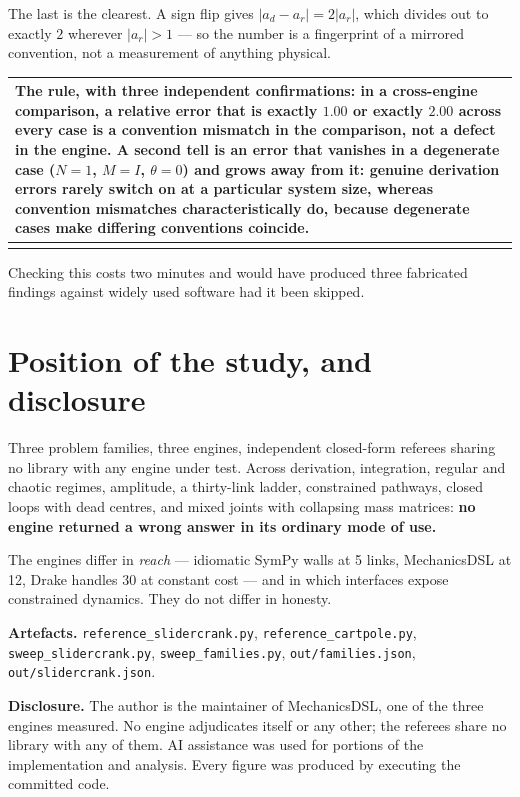 \documentclass[11pt,a4paper]{article}
\makeatletter
\newenvironment{callout}
  {\par\medskip\noindent\begin{tabular}{@{}p{0.94\textwidth}@{}}
   \arrayrulecolor{warnrule}\hline\rule{0pt}{2.6ex}}
  {\\[0.8ex]\hline\arrayrulecolor{black}\end{tabular}\par\medskip}
\makeatother
\begin{document}
\noindent The last is the clearest. A sign flip gives
$|a_d - a_r| = 2|a_r|$, which divides out to exactly $2$ wherever
$|a_r| > 1$ --- so the number is a fingerprint of a mirrored convention, not a
measurement of anything physical.

\begin{callout}
\textbf{The rule, with three independent confirmations:} in a cross-engine
comparison, a relative error that is exactly $1.00$ or exactly $2.00$ across
every case is a convention mismatch in the comparison, not a defect in the
engine. A second tell is an error that vanishes in a degenerate case
($N=1$, $M=I$, $\theta=0$) and grows away from it: genuine derivation errors
rarely switch on at a particular system size, whereas convention mismatches
characteristically do, because degenerate cases make differing conventions
coincide.
\end{callout}

\noindent Checking this costs two minutes and would have produced three
fabricated findings against widely used software had it been skipped.

\section{Position of the study, and disclosure}

Three problem families, three engines, independent closed-form referees sharing
no library with any engine under test. Across derivation, integration, regular
and chaotic regimes, amplitude, a thirty-link ladder, constrained pathways,
closed loops with dead centres, and mixed joints with collapsing mass matrices:
\textbf{no engine returned a wrong answer in its ordinary mode of use.}

The engines differ in \emph{reach} --- idiomatic SymPy walls at 5 links,
MechanicsDSL at 12, Drake handles 30 at constant cost --- and in which
interfaces expose constrained dynamics. They do not differ in honesty.

\medskip
\noindent\textbf{Artefacts.} \texttt{reference\_slidercrank.py},
\texttt{reference\_cartpole.py}, \texttt{sweep\_slidercrank.py},
\texttt{sweep\_families.py}, \texttt{out/families.json},
\texttt{out/slidercrank.json}.

\medskip
\noindent\textbf{Disclosure.} The author is the maintainer of MechanicsDSL, one
of the three engines measured. No engine adjudicates itself or any other; the
referees share no library with any of them. AI assistance was used for portions
of the implementation and analysis. Every figure was produced by executing the
committed code.
\end{document}
